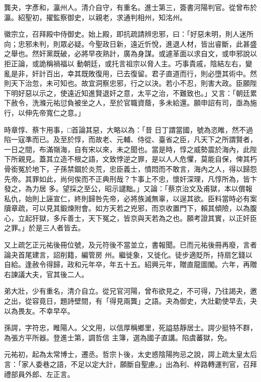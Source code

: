 \begin{pinyinscope}
 龔夬，字彥和，瀛州人。清介自守，有重名。進士第三，簽書河陽判官。從曾布於瀛。紹聖初，擢監察御史，以親老，求通判相州，知洺州。



 徽宗立，召拜殿中侍御史。始上殿，即抗疏請辨忠邪，曰：「好惡未明，則人迷所向；忠邪未判，則眾必疑。今聖政日新，遠近忻悅，進退人材，皆出睿斷，此甚盛之舉也。然奸黨既破，必將早夜熟計，廣為身謀。或遽革面以求自文，或申邪說以拒正論，或詭稱禍福以
 動朝廷，或托言祖宗以脅人主。巧事貴戚，陰結左右，變亂是非，奸計百出，幸其既敗復用，已去復留。君子直道而行，則必墮其術中。然則天下治忽，未可知也。故宜洞察忠邪，行之以決。若小不忍，則害大政。臣願陛下明好惡以示之，使遠近知進賢退奸之意，太平之治，不難致也。」又言：「朝廷累下赦令，洗滌元祐愆負被坐之人，至於官職資蔭，多未給還。願申詔有司，亟為施行，以伸先帝寬仁之意。」



 時章惇、蔡卞用事，□首論其惡，大略以為：「昔
 日丁謂當國，號為恣睢，然不過陷一寇準而已。及至於惇，而故老、元輔、侍從、臺省之臣，凡天下之所謂賢者，一日之間，布滿嶺海，自有宋以來，未之聞也。當是時，惇之威勢震於海內，此陛下所親見。蓋其立造不根之語，文致悖逆之罪，是以人人危懼，莫能自保，俾其朽骨銜冤於地下，子孫禁錮於炎荒，忠臣義士，憤悶而不敢言，海內之人，得以歸怨先帝。其罪如此，尚何俟而不正典刑哉？卞事上不忠，懷奸深理，凡惇所為，皆卞發之，為力居
 多。望採之至公，昭示譴黜。」又論：「蔡京治文及甫獄，本以償報私仇，始則上誣宣仁，終則歸咎先帝，必將族滅無辜，以逞其欲。臣料當時必有案牘章疏，可以見其鍛煉附會。如方天若之兇邪，而京收置門下，賴其傾險，以為腹心，立起犴獄，多斥善士，天下冤之，皆京與天若為之也。願考證其實，以正奸臣之罪。」於是三人者皆去。



 又上疏乞正元祐後冊位號，及元符後不當並立，書報聞。已而元祐後冊再廢，言者論夬首尾建言，詔削籍，編管房
 州。繼徙象，又徙化。徒步適貶所，持扇乞錢以自給。逢赦令得歸，政和元年卒，年五十五。紹興元年，贈直龍圖閣。六年，再贈右諫議大夫，官其後二人。



 弟大壯，少有重名，清介自立。從兄官河陽，曾布欲見之，不可得，乃往謁夬，邀之出，從容竟日，題詩壁間，有「得見兩龔」之語。夬為御史，大壯勸使早去，夬以為畏友。不幸早卒。



 孫諤，字符忠，睢陽人。父文用，以信厚稱鄉里，死謚慈靜居士。諤少挺特不群，為張方平所器。登進士第，調哲信
 主簿，選為國子直講。陷虞蕃獄，免。



 元祐初，起為太常博士，遷丞。哲宗卜後，太史惑陰陽拘忌之說，諤上疏太皇太后言：「家人委巷之語，不足以定大計，願斷自聖慮。」出為利、梓路轉運判官，召拜禮部員外郎、左正言。




\end{pinyinscope}
